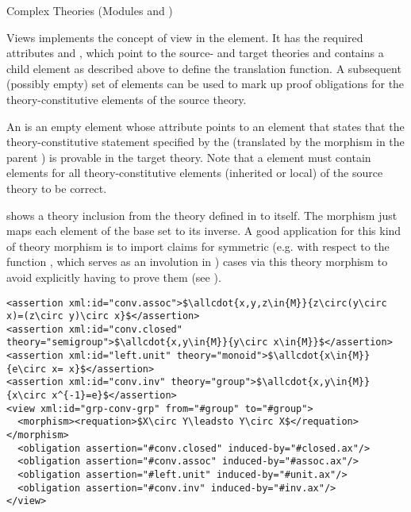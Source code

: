 \begin{tchapter}[id=complex-theories,short=Complex Theories]{Complex Theories (Modules
     and )}
\begin{tsection}[id=views]{Views}
  \omdoc implements the concept of view in the  
  element. It has the required attributes  and ,
  which point to the source- and target theories and contains a  child
  element as described above to define the translation function. A subsequent (possibly
  empty) set of  elements can be used to mark up proof obligations for
  the theory-constitutive elements of the source theory.

  An  is an empty element whose 
  attribute points to an  element that states that the
  theory-constitutive statement specified by the 
  (translated by the morphism in the parent ) is provable in the target
  theory. Note that a  element must contain 
  elements for all theory-constitutive elements (inherited or local) of the source theory
  to be correct.

 shows a theory inclusion from the theory
 defined in  to itself. The morphism just
maps each element of the base set to its inverse. A good application for this kind
of theory morphism is to import claims for symmetric (e.g. with respect to the
function , which serves as an involution in )
cases via this theory morphism to avoid explicitly having to prove them (see
).

\begin{lstlisting}[label=lst:view,mathescape,
  caption={A Theory Inclusion for Groups},
  index={view,morphism,requation,assertion}]
<assertion xml:id="conv.assoc">$\allcdot{x,y,z\in{M}}{z\circ(y\circ x)=(z\circ y)\circ x}$</assertion>
<assertion xml:id="conv.closed" theory="semigroup">$\allcdot{x,y\in{M}}{y\circ x\in{M}}$</assertion>
<assertion xml:id="left.unit" theory="monoid">$\allcdot{x\in{M}}{e\circ x= x}$</assertion>
<assertion xml:id="conv.inv" theory="group">$\allcdot{x,y\in{M}}{x\circ x^{-1}=e}$</assertion>
<view xml:id="grp-conv-grp" from="#group" to="#group">
  <morphism><requation>$X\circ Y\leadsto Y\circ X$</requation></morphism>
  <obligation assertion="#conv.closed" induced-by="#closed.ax"/>
  <obligation assertion="#conv.assoc" induced-by="#assoc.ax"/>
  <obligation assertion="#left.unit" induced-by="#unit.ax"/>
  <obligation assertion="#conv.inv" induced-by="#inv.ax"/>
</view>  
\end{lstlisting}
\end{tsection}


\end{tchapter}

